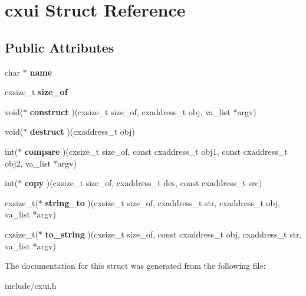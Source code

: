 \hypertarget{structcxui}{}\section{cxui Struct Reference}
\label{structcxui}
\subsection*{Public Attributes}
\begin{DoxyCompactItemize}
\item 
\mbox{\label{structcxui_a9edf2234d6c5e377b374b7d6c950bbf5}} 
char $\ast$ {\bfseries name}
\item 
\mbox{\label{structcxui_a51857dc6e083abb11aea3dfbd8cbcefe}} 
cxsize\+\_\+t {\bfseries size\+\_\+of}
\item 
\mbox{\label{structcxui_a875809f41c644cb1541c1432ca937ee7}} 
void($\ast$ {\bfseries construct} )(cxsize\+\_\+t size\+\_\+of, cxaddress\+\_\+t obj, va\+\_\+list $\ast$argv)
\item 
\mbox{\label{structcxui_a3d7dd83e42ba2a7d6a0aa49527162b90}} 
void($\ast$ {\bfseries destruct} )(cxaddress\+\_\+t obj)
\item 
\mbox{\label{structcxui_a4c667e63ed3718837c8d72a61f08c5e7}} 
int($\ast$ {\bfseries compare} )(cxsize\+\_\+t size\+\_\+of, const cxaddress\+\_\+t obj1, const cxaddress\+\_\+t obj2, va\+\_\+list $\ast$argv)
\item 
\mbox{\label{structcxui_abb0c082998801b196b4628c677d52355}} 
int($\ast$ {\bfseries copy} )(cxsize\+\_\+t size\+\_\+of, cxaddress\+\_\+t des, const cxaddress\+\_\+t src)
\item 
\mbox{\label{structcxui_a0557283698a935aaa7975cfe7f988991}} 
cxsize\+\_\+t($\ast$ {\bfseries string\+\_\+to} )(cxsize\+\_\+t size\+\_\+of, cxaddress\+\_\+t str, cxaddress\+\_\+t obj, va\+\_\+list $\ast$argv)
\item 
\mbox{\label{structcxui_a74e72113821a16a7c2e5d73c9a954d1e}} 
cxsize\+\_\+t($\ast$ {\bfseries to\+\_\+string} )(cxsize\+\_\+t size\+\_\+of, const cxaddress\+\_\+t obj, cxaddress\+\_\+t str, va\+\_\+list $\ast$argv)
\end{DoxyCompactItemize}


The documentation for this struct was generated from the following file\+:\begin{DoxyCompactItemize}
\item 
include/cxui.\+h\end{DoxyCompactItemize}
